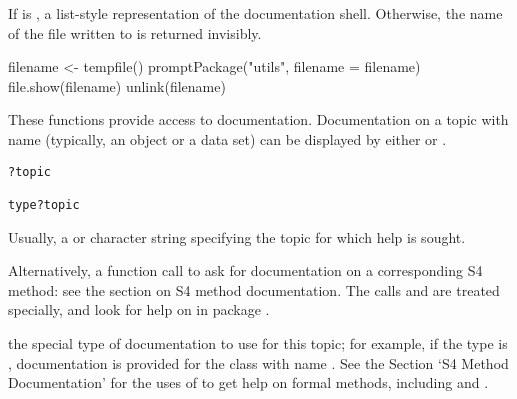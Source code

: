%
\begin{Value}
If  is , a list-style representation of the
documentation shell.  Otherwise, the name of the file written to is
returned invisibly.
\end{Value}
%
\begin{SeeAlso}\relax
{}
\end{SeeAlso}
%
\begin{Examples}
\begin{ExampleCode}

filename <- tempfile()
promptPackage("utils", filename = filename)
file.show(filename)
unlink(filename)
\end{ExampleCode}
\end{Examples}
%
\begin{Description}\relax
These functions provide access to documentation.
Documentation on a topic with name  (typically, an \R{}
object or a data set) can be displayed by either  or
.
\end{Description}
%
\begin{Usage}
\begin{verbatim}
?topic

type?topic
\end{verbatim}
\end{Usage}
%
\begin{Arguments}
\begin{ldescription}
\item[\code{topic}] Usually, a  or character string specifying the
topic for which help is sought.

Alternatively, a function call to ask for documentation on a
corresponding S4 method: see the section on S4 method documentation.
The calls  and
 are treated specially, and look for
help on  in package .

\item[\code{type}] the special type of documentation to use for this topic;
for example, if the type is , documentation is
provided for the class with name .
See the Section `S4 Method Documentation' for the uses of
 to get help on formal methods, including
 and .

\end{ldescription}
\end{Arguments}
